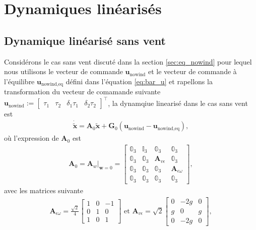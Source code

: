 \section{Dynamiques linéarisés}
\subsection{Dynamique linéarisé sans vent}
Considérons le cas sans vent discuté dans la section \ref{sec:eq_nowind} pour lequel nous utilisons le vecteur de commande $\boldsymbol{u}_{\text{nowind}}$  et le vecteur de commande à l'équilibre $\boldsymbol{u}_{\text{nowind},\text{eq}}$ défini dans l'équation \eqref{eq:bar_u} et rapellons la transformation du vecteur de comamande suivante $ \boldsymbol{u}_{\text{nowind}} := \begin{bmatrix}\tau_{1}  \!&\! \tau_{2}  \!&\! \delta_{1}\tau_{1} \!&\! \delta_{2}\tau_{2} \end{bmatrix}^\top$, la dynamqiue linearisé dans le cas sans vent est 
\begin{align}
    \label{eq:linearized}
     \boldsymbol{\dot{\tilde{x}}} = \boldsymbol{A}_{0} \tilde{\boldsymbol{x}} + \boldsymbol{G}_{0} (\boldsymbol{u}_{\text{nowind}}-\boldsymbol{u}_{\text{nowind},\text{eq}}),
\end{align}
où l'expression de $\boldsymbol{A}_{0}$ est
\begin{align}
    \label{matrice_A}
        \boldsymbol{A}_{0} = \boldsymbol{A}_{w} \Big|_{\boldsymbol{w}=0} =\begin{bmatrix}
        \mathbb{0}_{3} & \mathbb{I}_{3} & \mathbb{0}_{3} & \mathbb{0}_{3} \\
        \mathbb{0}_{3} & \mathbb{0}_{3} &  \boldsymbol{A}_{v\epsilon} & \mathbb{0}_{3} \\
        \mathbb{0}_{3} & \mathbb{0}_{3} & \mathbb{0}_{3} & \boldsymbol{A}_{\epsilon\omega} \\
        \mathbb{0}_{3} & \mathbb{0}_{3} & \mathbb{0}_{3} & \mathbb{0}_{3}
        \end{bmatrix},
\end{align}
avec les matrices suivante
\begin{align*}
    \boldsymbol{A}_{\epsilon\omega} = \frac{\sqrt{2}}{4}\begin{bmatrix} 
        1 & 0 & -1 \\ 
        0 & 1 & 0  \\
       1 & 0 & 1
    \end{bmatrix} \text{ et } \boldsymbol{A}_{ v\epsilon} = \sqrt{2}\begin{bmatrix} 
        0 & -2g & 0\\
        g & 0 & g  \\ 
         0 & -2g & 0 \end{bmatrix},
\end{align*}
